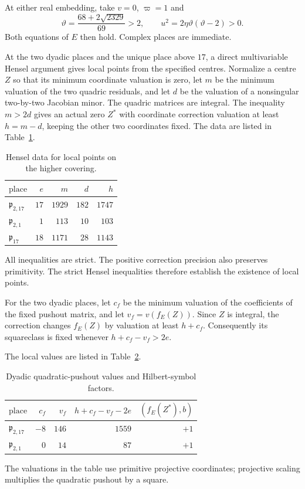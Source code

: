 \documentclass[11pt,a4paper]{article}
\theoremstyle{definition}\newtheorem{definition}[theorem]{Definition}
\theoremstyle{remark}\newtheorem{remark}[theorem]{Remark}
\begin{document}
At either real embedding, take $v=0$, $\varpi=1$ and
\[
 \vartheta=\frac{68+2\sqrt{2329}}{69}>2,
 \qquad u^2=2\eta\vartheta(\vartheta-2)>0.
\]
Both equations of $E$ then hold.  Complex places are immediate.

At the two dyadic places and the unique place above $17$, a direct
multivariable Hensel argument gives local points from the specified centres.  Normalize a centre $Z$ so that its minimum coordinate valuation
is zero, let $m$ be the minimum valuation of the two quadric residuals,
and let $d$ be the valuation of a nonsingular two-by-two Jacobian minor.
The quadric matrices are integral.  The inequality $m>2d$ gives an
actual zero $Z^*$ with coordinate correction valuation at least $h=m-d$,
keeping the other two coordinates fixed.  The data are listed in Table~\ref{tab:4}.
\begin{table}[htbp]
\centering
\caption{Hensel data for local points on the higher covering.}\label{tab:4}
\begin{tabular}{lrrrr}
\toprule
$\text{place}$ & $e$ & $m$ & $d$ & $h$\\
\midrule
$\mathfrak p_{2,17}$ & $17$ & $1929$ & $182$ & $1747$\\
$\mathfrak p_{2,1}$ & $1$ & $113$ & $10$ & $103$\\
$\mathfrak p_{17}$ & $18$ & $1171$ & $28$ & $1143$\\
\bottomrule
\end{tabular}
\end{table}
All inequalities are strict.  The positive correction precision also
preserves primitivity.  The strict Hensel inequalities therefore establish the existence of local points.

For the two dyadic places, let $c_f$ be the minimum valuation of the
coefficients of the fixed pushout matrix, and let $v_f=v(f_E(Z))$.
Since $Z$ is integral, the correction changes $f_E(Z)$ by valuation
at least $h+c_f$.  Consequently its squareclass is fixed whenever
$h+c_f-v_f>2e$.  

The local values are listed in Table~\ref{tab:5}.
\begin{table}[htbp]
\centering
\caption{Dyadic quadratic-pushout values and Hilbert-symbol factors.}\label{tab:5}
\begin{tabular}{lrrrr}
\toprule
$\text{place}$ & $c_f$ & $v_f$ & $h+c_f-v_f-2e$ & $(f_E(Z^*),b)$\\
\midrule
$\mathfrak p_{2,17}$ & $-8$ & $146$ & $1559$ & $+1$\\
$\mathfrak p_{2,1}$ & $0$ & $14$ & $87$ & $+1$\\
\bottomrule
\end{tabular}
\end{table}
The valuations in the table use primitive projective coordinates; projective scaling multiplies the quadratic pushout by a square.
\end{document}

